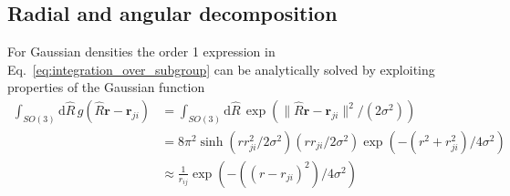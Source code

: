 \subsection{Radial and angular decomposition}
%
For Gaussian densities the order 1 expression in Eq.~\eqref{eq:integration_over_subgroup} can be analytically solved by exploiting properties of the Gaussian function~\cite{musil2019machine}
\begin{subequations}
\begin{align}
  \label{eq:order1_analytical_solution}
  \int_{SO(3)} \mathrm{d}\hat{R}\, g(\hat{R}\mathbf{r}-\mathbf{r}_{ji}) %
   &= \int_{SO(3)} \mathrm{d}\hat{R}\, \exp(\|\hat{R}\mathbf{r}-\mathbf{r}_{ji}\|^2/(2\sigma^2)) \\
   &= 8\pi^2 \sinh(rr_{ji}^2/2\sigma^2)(rr_{ji}/2\sigma^2)\exp(-(r^2+r_{ji}^2)/4\sigma^2) \\
   &\approx \frac{1}{r_{ij}}\exp(-((r-r_{ji})^2)/4\sigma^2)
\end{align}
\end{subequations}
